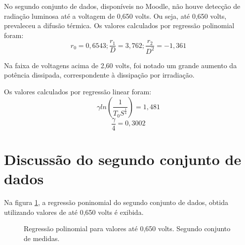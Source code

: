 \documentclass[brazilian,12pt,a4paper,final]{article}
\begin{document}
No segundo conjunto de dados, disponíveis no Moodle, 
não houve detecção de radiação luminosa até a voltagem de 0,650 volts.
Ou seja, até 0,650 volts, prevaleceu a difusão térmica.
Os valores calculados por regressão polinomial foram:
$$r_0=0,6543; \frac{r_1}{D}=3,762; \frac{r_2}{D^2}=-1,361$$

Na faixa de voltagens acima de 2,60 volts, foi notado um grande aumento da
potência dissipada, correspondente à dissipação por irradiação.

Os valores calculados por regressão linear foram:
$$\gamma ln(\frac{1}{T_0S^\frac{1}{4}}) = 1,481$$
$$\frac{\gamma}{4}=0,3002$$

\section{Discussão do segundo conjunto de dados}

Na figura \ref{figiniciopeq2}, a regressão poninomial do segundo conjunto
de dados, obtida utilizando 
valores de até 0,650 volts é exibida.

\begin{figure}[htbp!]
  \caption{Regressão polinomial para valores até 0,650 volts. Segundo conjunto de medidas.}
  \label{figiniciopeq2}
  \centering
\end{figure}
\end{document}
